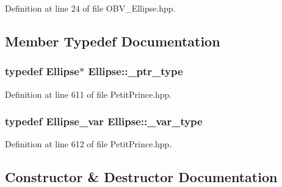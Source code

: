 Definition at line 24 of file O\+B\+V\+\_\+\+Ellipse.\+hpp.



\subsection{Member Typedef Documentation}
\subsubsection[{\texorpdfstring{\+\_\+ptr\+\_\+type}{_ptr_type}}]{\setlength{\rightskip}{0pt plus 5cm}typedef {\bf Ellipse}$\ast$ {\bf Ellipse\+::\+\_\+ptr\+\_\+type}}\hypertarget{class_ellipse_ac03e9a197e4d346d6a7f4360f83affdc}{}\label{class_ellipse_ac03e9a197e4d346d6a7f4360f83affdc}


Definition at line 611 of file Petit\+Prince.\+hpp.

\subsubsection[{\texorpdfstring{\+\_\+var\+\_\+type}{_var_type}}]{\setlength{\rightskip}{0pt plus 5cm}typedef {\bf Ellipse\+\_\+var} {\bf Ellipse\+::\+\_\+var\+\_\+type}}\hypertarget{class_ellipse_af5ce6e507c505dcd1b6ef888b904616f}{}\label{class_ellipse_af5ce6e507c505dcd1b6ef888b904616f}


Definition at line 612 of file Petit\+Prince.\+hpp.



\subsection{Constructor \& Destructor Documentation}
